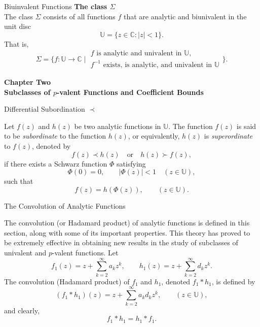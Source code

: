 \documentclass{beamer}
\newcommand{\C}{\mathbb{C}}
\newcommand{\U}{\mathbb{U}}
\begin{document}
	\begin{frame}{Biuinvalent Functions}
		\textbf{The class \(\Sigma\)}\\
		The class \(\Sigma\) consists of all functions \(f\) that are analytic and biunivalent in the unit disc
		\[
		\U = \{ z \in \C : |z| < 1 \}.
		\]
		That is,
		\[
		\Sigma = \Bigg\{ f : \U \to \C \;\Bigg|\;
		\begin{array}{l}
			f \text{ is analytic and univalent in } \U,\\[1mm]
			f^{-1} \text{ exists, is analytic, and univalent in } \U
		\end{array}
		\Bigg\}.
		\]
	\end{frame}
	
	\begin{frame}
		\begin{center}
			\Huge \textbf{Chapter Two}\\[40pt]
			\textbf{Subclasses of $p$-valent Functions and Coefficient Bounds}
		\end{center}
	\end{frame}
	
	\begin{frame}{Differential Subordination $\prec$}
		
		Let $f(z)$ and $h(z)$ be two analytic functions in $\U$. The function $f(z)$ is said to be \emph{subordinate} to the function $h(z)$, or equivalently, $h(z)$ is \emph{superordinate} to $f(z)$, denoted by
		\[
		f(z) \prec h(z) \quad \text{or} \quad h(z) \succ f(z),
		\]
		if there exists a Schwarz function $\Phi$ satisfying
		\[
		\Phi(0) = 0, \qquad |\Phi(z)| < 1 \quad (z \in \U),
		\]
		such that
		\[
		f(z) = h(\Phi(z)), \qquad (z \in \U).
		\]
	\end{frame}
	
	\begin{frame}{The Convolution of Analytic Functions}
		
		The convolution (or Hadamard product) of analytic functions is defined in this section, along with some of its important properties. This theory has proved to be extremely effective in obtaining new results in the study of subclasses of univalent and $p$-valent functions.
		Let
		\[
		f_1(z) = z + \sum_{k=2}^{\infty} a_k z^k, 
		\qquad
		h_1(z) = z + \sum_{k=2}^{\infty} d_k z^k.
		\]
		The convolution (Hadamard product) of $f_1$ and $h_1$, denoted $f_1 * h_1$, is defined by
		\[
		(f_1 * h_1)(z) = z + \sum_{k=2}^{\infty} a_k d_k z^k, \qquad (z \in \U),
		\]
		and clearly,
		\[
		f_1 * h_1 = h_1 * f_1.
		\]
	\end{frame}
	
\end{document}
